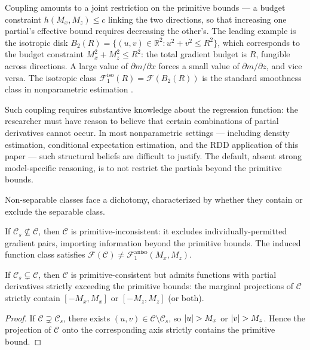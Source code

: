 Coupling amounts to a joint restriction on the primitive bounds --- a budget constraint $h(M_x, M_z) \leq c$ linking the two directions, so that increasing one partial's effective bound requires decreasing the other's.
The leading example is the isotropic disk $B_2(R) = \bigl\{ (u, v) \in \mathbb{R}^2 : u^2 + v^2 \leq R^2 \bigr\}$, which corresponds to the budget constraint $M_x^2 + M_z^2 \leq R^2$: the total gradient budget is $R$, fungible across directions.
A large value of $\partial m / \partial x$ forces a small value of $\partial m / \partial z$, and vice versa.
The isotropic class $\mathcal{F}_1^{\mathrm{iso}}(R) = \mathcal{F}(B_2(R))$ is the standard smoothness class in nonparametric estimation \parencite[e.g.,][]{tsybakov_introduction_2009,stone_optimal_1982}.

Such coupling requires substantive knowledge about the regression function: the researcher must have reason to believe that certain combinations of partial derivatives cannot occur.
In most nonparametric settings --- including density estimation, conditional expectation estimation, and the RDD application of this paper --- such structural beliefs are difficult to justify.
The default, absent strong model-specific reasoning, is to not restrict the partials beyond the primitive bounds.

Non-separable classes face a dichotomy, characterized by whether they contain or exclude the separable class.

\begin{corollary}\label{cor:coupling_restricts}
	If $\mathcal{C}_s \not\subseteq \mathcal{C}$, then $\mathcal{C}$ is primitive-inconsistent: it excludes individually-permitted gradient pairs, importing information beyond the primitive bounds.
	The induced function class satisfies $\mathcal{F}(\mathcal{C}) \neq \mathcal{F}_1^{\mathrm{aniso}}(M_x, M_z)$.
\end{corollary}

\begin{corollary}\label{cor:iso_inflates}
	If $\mathcal{C}_s \subsetneq \mathcal{C}$, then $\mathcal{C}$ is primitive-consistent but admits functions with partial derivatives strictly exceeding the primitive bounds: the marginal projections of $\mathcal{C}$ strictly contain $[-M_x, M_x]$ or $[-M_z, M_z]$ (or both).
\end{corollary}

\begin{proof}
	If $\mathcal{C} \supsetneq \mathcal{C}_s$, there exists $(u, v) \in \mathcal{C} \setminus \mathcal{C}_s$, so $\lvert u\rvert > M_x$ or $\lvert v\rvert > M_z$.
	Hence the projection of $\mathcal{C}$ onto the corresponding axis strictly contains the primitive bound.
\end{proof}


